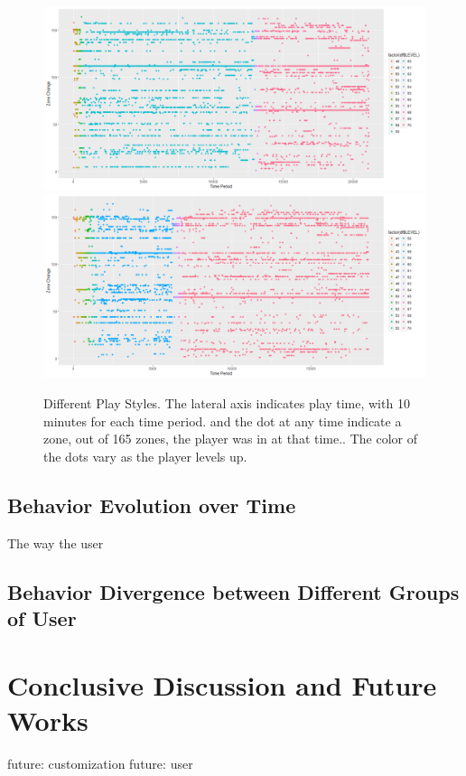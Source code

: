 \documentclass{sigchi}
\begin{document}
\begin{figure}[t]
    \centering
    \includegraphics[width=\textwidth]{figs/Rplot31.png}
    \includegraphics[width=\textwidth]{figs/Rplot36.png}
    \caption{Different Play Styles. The lateral axis indicates play time, with 10 minutes for each time period. and the dot at any time indicate a zone, out of 165 zones, the player was in at that time.. The color of the dots vary as the player levels up.}
    \label{fig:trajectory}
\end{figure}

\subsection{Behavior Evolution over Time}

The way the user 

\subsection{Behavior Divergence between Different Groups of User}

\section{Conclusive Discussion and Future Works}

future: customization
future: user



\end{document}

